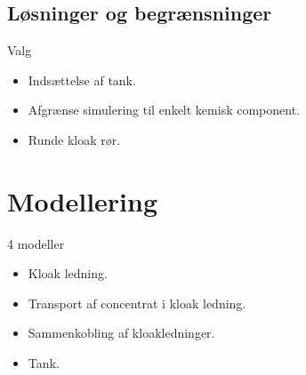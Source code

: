 \subsection{Løsninger og begrænsninger}
\begin{frame}{Valg}{}
\vfill\vfill\centering
\begin{itemize}
	\item<1-> Indsættelse af tank.
	\vspace{4mm}
	\item<2-> Afgrænse simulering til enkelt kemisk component.
	\vspace{4mm}
	\item<3-> Runde kloak rør.
\end{itemize}
\vfill\vfill	
\end{frame}

\section{Modellering}

\begin{frame}{4 modeller}{}
	\vfill\vfill\centering
\begin{itemize}
	\item Kloak ledning.
	\vspace{4mm}
	\item Transport af concentrat i kloak ledning.
	\vspace{4mm}
	\item Sammenkobling af kloakledninger.
	\vspace{4mm}
	\item Tank. 
\end{itemize}
\vfill\vfill		
\end{frame}


